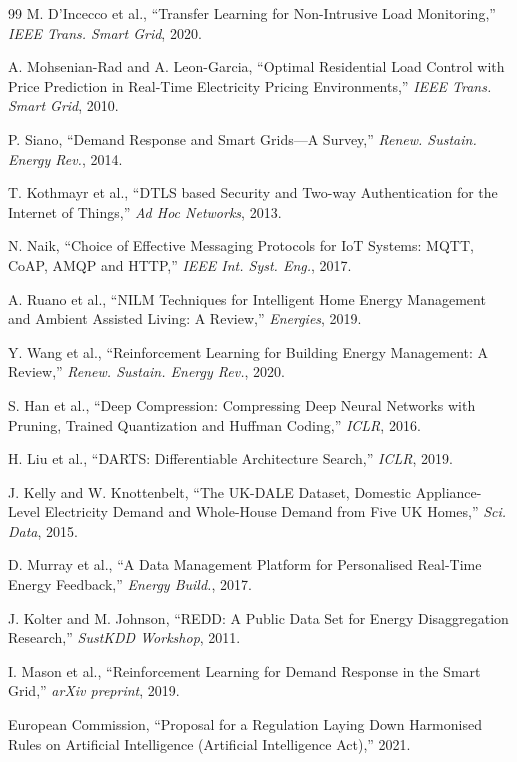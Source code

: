 \documentclass[11pt,a4paper]{article}
\begin{document}
\begin{thebibliography}{99}
M. D'Incecco et al., ``Transfer Learning for Non-Intrusive Load Monitoring,'' \textit{IEEE Trans. Smart Grid}, 2020.

A. Mohsenian-Rad and A. Leon-Garcia, ``Optimal Residential Load Control with Price Prediction in Real-Time Electricity Pricing Environments,'' \textit{IEEE Trans. Smart Grid}, 2010.

P. Siano, ``Demand Response and Smart Grids---A Survey,'' \textit{Renew. Sustain. Energy Rev.}, 2014.

T. Kothmayr et al., ``DTLS based Security and Two-way Authentication for the Internet of Things,'' \textit{Ad Hoc Networks}, 2013.

N. Naik, ``Choice of Effective Messaging Protocols for IoT Systems: MQTT, CoAP, AMQP and HTTP,'' \textit{IEEE Int. Syst. Eng.}, 2017.

A. Ruano et al., ``NILM Techniques for Intelligent Home Energy Management and Ambient Assisted Living: A Review,'' \textit{Energies}, 2019.

Y. Wang et al., ``Reinforcement Learning for Building Energy Management: A Review,'' \textit{Renew. Sustain. Energy Rev.}, 2020.

S. Han et al., ``Deep Compression: Compressing Deep Neural Networks with Pruning, Trained Quantization and Huffman Coding,'' \textit{ICLR}, 2016.

H. Liu et al., ``DARTS: Differentiable Architecture Search,'' \textit{ICLR}, 2019.

J. Kelly and W. Knottenbelt, ``The UK-DALE Dataset, Domestic Appliance-Level Electricity Demand and Whole-House Demand from Five UK Homes,'' \textit{Sci. Data}, 2015.

D. Murray et al., ``A Data Management Platform for Personalised Real-Time Energy Feedback,'' \textit{Energy Build.}, 2017.

J. Kolter and M. Johnson, ``REDD: A Public Data Set for Energy Disaggregation Research,'' \textit{SustKDD Workshop}, 2011.

I. Mason et al., ``Reinforcement Learning for Demand Response in the Smart Grid,'' \textit{arXiv preprint}, 2019.

European Commission, ``Proposal for a Regulation Laying Down Harmonised Rules on Artificial Intelligence (Artificial Intelligence Act),'' 2021.

\end{thebibliography}
\end{document}
